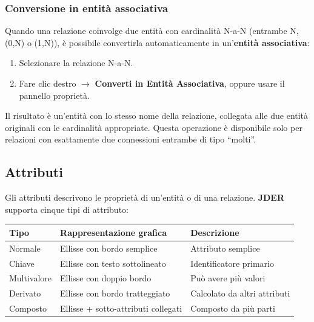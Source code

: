 \documentclass[a4paper,11pt]{article}
\newcommand{\uielement}[1]{\textbf{#1}}
\newcommand{\jder}{\textbf{JDER}}
\begin{document}
\subsubsection{Conversione in entità associativa}

Quando una relazione coinvolge due entità con cardinalità N-a-N (entrambe N, (0,N) o (1,N)),
è possibile convertirla automaticamente in un'\textbf{entità associativa}:

\begin{enumerate}
  \item Selezionare la relazione N-a-N.
  \item Fare clic destro $\to$ \uielement{Converti in Entità Associativa}, oppure usare il
        pannello proprietà.
\end{enumerate}

Il risultato è un'entità con lo stesso nome della relazione, collegata alle due entità originali
con le cardinalità appropriate. Questa operazione è disponibile solo per relazioni con esattamente
due connessioni entrambe di tipo ``molti''.

\subsection{Attributi}

Gli attributi descrivono le proprietà di un'entità o di una relazione. \jder{} supporta cinque
tipi di attributo:

\begin{center}
\begin{tabular}{@{}lll@{}}
  \toprule
  \textbf{Tipo} & \textbf{Rappresentazione grafica} & \textbf{Descrizione} \\
  \midrule
  Normale    & Ellisse con bordo semplice & Attributo semplice \\
  Chiave     & Ellisse con testo sottolineato & Identificatore primario \\
  Multivalore & Ellisse con doppio bordo & Può avere più valori \\
  Derivato   & Ellisse con bordo tratteggiato & Calcolato da altri attributi \\
  Composto   & Ellisse + sotto-attributi collegati & Composto da più parti \\
  \bottomrule
\end{tabular}
\end{center}
\end{document}
